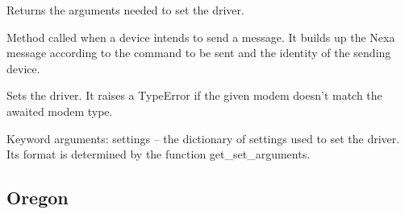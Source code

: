 \documentclass[letterpaper,10pt,english]{sphinxmanual}
\begin{document}
\begin{fulllineitems}
\begin{fulllineitems}
\end{fulllineitems}


\begin{fulllineitems}
\label{implementation_examples:protocols.nexa.Nexa.get_set_arguments}
Returns the arguments needed to set the driver.

\end{fulllineitems}


\begin{fulllineitems}
\label{implementation_examples:protocols.nexa.Nexa.send_command}
Method called when a device intends to send a message.
It builds up the Nexa message according to the command 
to be sent and the identity of the sending device.

\end{fulllineitems}


\begin{fulllineitems}
\label{implementation_examples:protocols.nexa.Nexa.set}
Sets the driver. It raises a TypeError if the given modem doesn't
match the awaited modem type.

Keyword arguments:
settings -- the dictionary of settings used to set the driver. Its 
format is determined by the function get\_set\_arguments.

\end{fulllineitems}


\end{fulllineitems}



\subsection{Oregon}
\label{implementation_examples:oregon}
\end{document}
